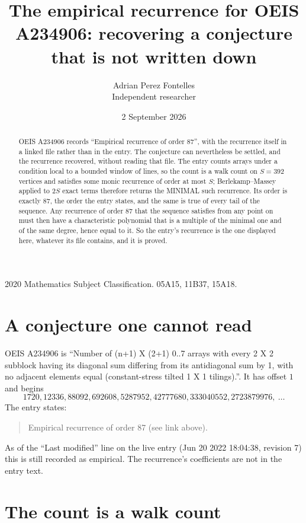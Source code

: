 \documentclass[11pt,a4paper]{article}
\title{The empirical recurrence for OEIS A234906: recovering a conjecture that is not written down}
\author{Adrian Perez Fontelles\\ \small Independent researcher}
\date{2 September 2026}
\theoremstyle{plain}
\theoremstyle{definition}
\begin{document}
\maketitle

\begin{abstract}
OEIS A234906 records ``Empirical recurrence of order $87$'', with the recurrence itself in a
linked file rather than in the entry. The conjecture can nevertheless be settled, and the
recurrence recovered, without reading that file. The entry counts arrays under a condition
local to a bounded window of lines, so the count is a walk count on $S=392$ vertices and
satisfies some monic recurrence of order at most $S$; Berlekamp--Massey applied to $2S$ exact
terms therefore returns the MINIMAL such recurrence. Its order is exactly $87$, the order
the entry states, and the same is true of every tail of the sequence. Any recurrence of order
$87$ that the sequence satisfies from any point on must then have a characteristic
polynomial that is a multiple of the minimal one and of the same degree, hence equal to it. So
the entry's recurrence is the one displayed here, whatever its file contains, and it is
proved.
\end{abstract}

\noindent\small 2020 Mathematics Subject Classification. 05A15, 11B37, 15A18.\normalsize

\section{A conjecture one cannot read}

OEIS A234906 is ``Number of (n+1) X (2+1) 0..7 arrays with every 2 X 2 subblock having its diagonal sum differing from its antidiagonal sum by 1, with no adjacent elements equal (constant-stress tilted 1 X 1 tilings).''. It has offset $1$ and begins
\[
1720, 12336, 88092, 692608, 5287952, 42777680, 333040552, 2723879976,\ \dots
\]
The entry states:
\begin{quote}
Empirical recurrence of order 87 (see link above).
\end{quote}
As of the ``Last modified'' line on the live entry (Jun 20 2022 18:04:38, revision 7) this is still
recorded as empirical. The recurrence's coefficients are not in the entry text.

\section{The count is a walk count}
\end{document}
